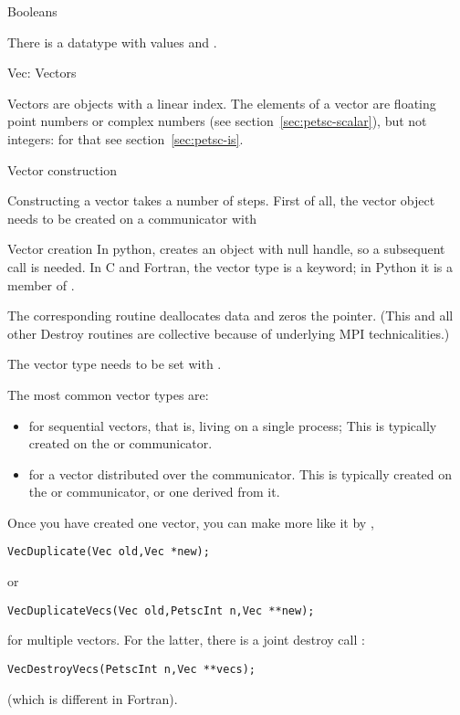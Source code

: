  {Booleans}

There is a  datatype
with values  and .

 {Vec: Vectors}

Vectors are objects with a linear index. The elements of a vector are
floating point numbers or complex numbers (see
section~\ref{sec:petsc-scalar}), but not integers: for that see
section~\ref{sec:petsc-is}.

 {Vector construction}

Constructing a vector takes a number of steps. First of all, the
vector object needs
to be created on a communicator with
%

\begin{pythonnote}{Vector creation}
  In python,  creates an object with null handle, so a
  subsequent  call is needed.
  In C and Fortran, the vector type is a keyword; in Python it is a
  member of .
\end{pythonnote}

The corresponding routine  deallocates data and zeros
the pointer.
(This and all other Destroy routines are collective because of underlying
MPI technicalities.)

The vector type needs to be set with .

The most common vector types are:
\begin{itemize}
\item {} for sequential vectors, that is, living on a single process;
  This is typically created on the  or
   communicator.
\item {} for a vector distributed over the communicator.
  This is typically created on the  or
   communicator, or one derived from it.
\end{itemize}

Once you have created one vector, you can make more like it by
,
\begin{lstlisting}
VecDuplicate(Vec old,Vec *new);
\end{lstlisting}
or 
\begin{lstlisting}
VecDuplicateVecs(Vec old,PetscInt n,Vec **new);
\end{lstlisting}
for multiple vectors.
For the latter, there is a joint destroy call
:
\begin{lstlisting}
VecDestroyVecs(PetscInt n,Vec **vecs);
\end{lstlisting}
(which is different in Fortran).

